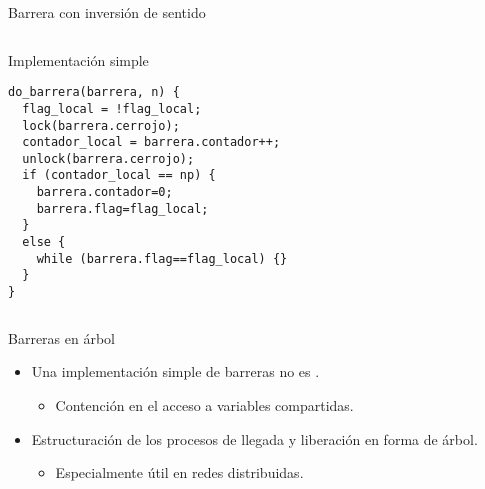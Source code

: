 \begin{frame}[t,fragile]{Barrera con inversión de sentido}
\begin{columns}

\begin{block}{Implementación simple}
\begin{lstlisting}
do_barrera(barrera, n) {
  flag_local = !flag_local;
  lock(barrera.cerrojo);
  contador_local = barrera.contador++;
  unlock(barrera.cerrojo);
  if (contador_local == np) {
    barrera.contador=0;
    barrera.flag=flag_local;
  }
  else {
    while (barrera.flag==flag_local) {}
  }
}
\end{lstlisting}
\end{block}


\end{columns}
\end{frame}

\begin{frame}[t]{Barreras en árbol}
\begin{itemize}
  \item Una implementación simple de barreras no es .
    \begin{itemize}
      \item Contención en el acceso a variables compartidas.
    \end{itemize}
  \item Estructuración de los procesos de llegada y liberación en forma de árbol.
    \begin{itemize}
      \item Especialmente útil en redes distribuidas.
    \end{itemize}

\end{itemize}
\end{frame}
